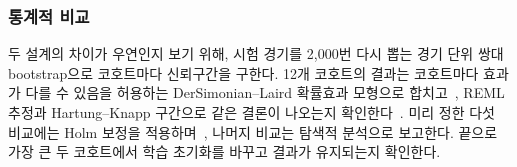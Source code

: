 \subsubsection{통계적 비교}
두 설계의 차이가 우연인지 보기 위해, 시험 경기를 2,000번 다시 뽑는 경기 단위 쌍대 bootstrap으로 코호트마다 신뢰구간을 구한다.
12개 코호트의 결과는 코호트마다 효과가 다를 수 있음을 허용하는 DerSimonian--Laird 확률효과 모형으로 합치고~\cite{DerSimonian86}, REML 추정과 Hartung--Knapp 구간으로 같은 결론이 나오는지 확인한다~\cite{HartungKnapp01}.
미리 정한 다섯 비교에는 Holm 보정을 적용하며~\cite{Holm79}, 나머지 비교는 탐색적 분석으로 보고한다. 
끝으로 가장 큰 두 코호트에서 학습 초기화를 바꾸고  결과가 유지되는지 확인한다.
